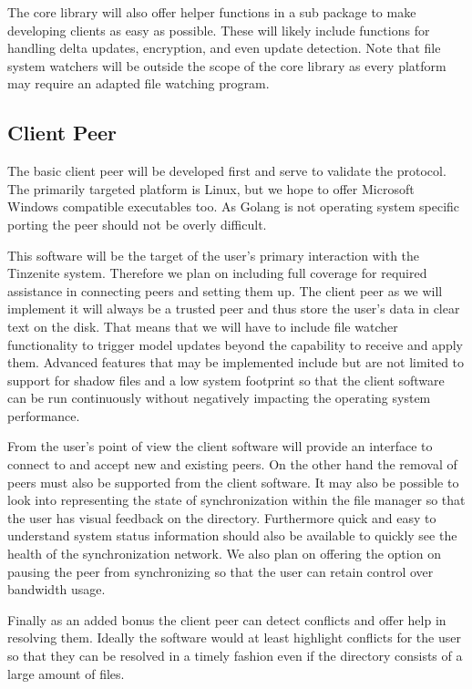 The core library will also offer helper functions in a sub package to make developing clients as easy as possible.
These will likely include functions for handling delta updates, encryption, and even update detection.
Note that file system watchers will be outside the scope of the core library as every platform may require an adapted file watching program.

\subsection{Client Peer}

The basic client peer will be developed first and serve to validate the protocol.
The primarily targeted platform is Linux, but we hope to offer Microsoft Windows compatible executables too.
As Golang is not operating system specific porting the peer should not be overly difficult.

This software will be the target of the user's primary interaction with the Tinzenite system.
Therefore we plan on including full coverage for required assistance in connecting peers and setting them up.
The client peer as we will implement it will always be a trusted peer and thus store the user's data in clear text on the disk.
That means that we will have to include file watcher functionality to trigger model updates beyond the capability to receive and apply them.
Advanced features that may be implemented include but are not limited to support for shadow files and a low system footprint so that the client software can be run continuously without negatively impacting the operating system performance.

From the user's point of view the client software will provide an interface to connect to and accept new and existing peers.
On the other hand the removal of peers must also be supported from the client software.
It may also be possible to look into representing the state of synchronization within the file manager so that the user has visual feedback on the directory.
Furthermore quick and easy to understand system status information should also be available to quickly see the health of the synchronization network.
We also plan on offering the option on pausing the peer from synchronizing so that the user can retain control over bandwidth usage.

Finally as an added bonus the client peer can detect conflicts and offer help in resolving them.
Ideally the software would at least highlight conflicts for the user so that they can be resolved in a timely fashion even if the directory consists of a large amount of files.

